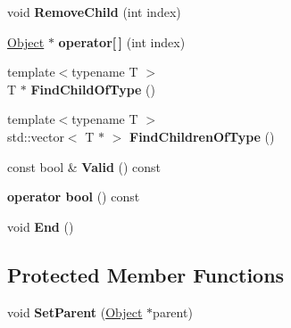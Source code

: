 \begin{DoxyCompactItemize}
\item 
\hypertarget{class_aspen_1_1_object_1_1_object_a22293512e329cc43dd36f2538b2fdcb9}{void {\bfseries Remove\-Child} (int index)}\label{class_aspen_1_1_object_1_1_object_a22293512e329cc43dd36f2538b2fdcb9}

\item 
\hypertarget{class_aspen_1_1_object_1_1_object_a60955e31c71d4171274d28f6f8b38e3c}{\hyperlink{class_aspen_1_1_object_1_1_object}{Object} $\ast$ {\bfseries operator\mbox{[}$\,$\mbox{]}} (int index)}\label{class_aspen_1_1_object_1_1_object_a60955e31c71d4171274d28f6f8b38e3c}

\item 
\hypertarget{class_aspen_1_1_object_1_1_object_a077c6f008bd36517042170c3d589ebfb}{{\footnotesize template$<$typename T $>$ }\\T $\ast$ {\bfseries Find\-Child\-Of\-Type} ()}\label{class_aspen_1_1_object_1_1_object_a077c6f008bd36517042170c3d589ebfb}

\item 
\hypertarget{class_aspen_1_1_object_1_1_object_ac0bd3a26e078850907748692d727230b}{{\footnotesize template$<$typename T $>$ }\\std\-::vector$<$ T $\ast$ $>$ {\bfseries Find\-Children\-Of\-Type} ()}\label{class_aspen_1_1_object_1_1_object_ac0bd3a26e078850907748692d727230b}

\item 
\hypertarget{class_aspen_1_1_object_1_1_object_a2d5e6269408df50277e9377a0ea620de}{const bool \& {\bfseries Valid} () const }\label{class_aspen_1_1_object_1_1_object_a2d5e6269408df50277e9377a0ea620de}

\item 
\hypertarget{class_aspen_1_1_object_1_1_object_a8ca48323f4ac70852f6abdd33042a5b3}{{\bfseries operator bool} () const }\label{class_aspen_1_1_object_1_1_object_a8ca48323f4ac70852f6abdd33042a5b3}

\item 
\hypertarget{class_aspen_1_1_object_1_1_object_a056bfac305482ed281a5d850a2b2754c}{void {\bfseries End} ()}\label{class_aspen_1_1_object_1_1_object_a056bfac305482ed281a5d850a2b2754c}

\end{DoxyCompactItemize}
\subsection*{Protected Member Functions}
\begin{DoxyCompactItemize}
\item 
\hypertarget{class_aspen_1_1_object_1_1_object_aa7b58f0e55a3035f9ab1c958343e5857}{void {\bfseries Set\-Parent} (\hyperlink{class_aspen_1_1_object_1_1_object}{Object} $\ast$parent)}\label{class_aspen_1_1_object_1_1_object_aa7b58f0e55a3035f9ab1c958343e5857}

\end{DoxyCompactItemize}
